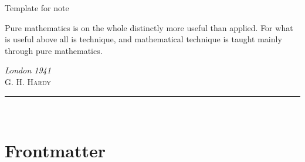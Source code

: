 \documentclass{note}
\begin{document}
\clearpage

\thispagestyle{empty}
\clearpage

\begin{titlepage}
\thispagestyle{empty} %
\noindent
\titlefont Template for note\par
\epigraph{Pure mathematics is on the whole distinctly more useful than applied. For what is useful above all is technique, and mathematical technique is taught mainly through pure mathematics.}%
{\textit{London 1941}\\ \textsc{G. H. Hardy}}
\null\vfill
\vspace*{1cm}
\noindent
\hfill
\begin{minipage}{0.5\linewidth}
    \begin{flushright}
        \printauthor
    \end{flushright}
\end{minipage}
%
\begin{minipage}{0.02\linewidth}
    \rule{1pt}{60pt}
\end{minipage}
\titlepagedecoration

\clearpage
~
\thispagestyle{empty}
\clearpage

\end{titlepage}

{
    \hypersetup{linkcolor=red!65!black} %
    \tableofcontents
}

\frontmatter

% 

\chapter{Frontmatter}
\lipsum[5-10]
\end{document}
